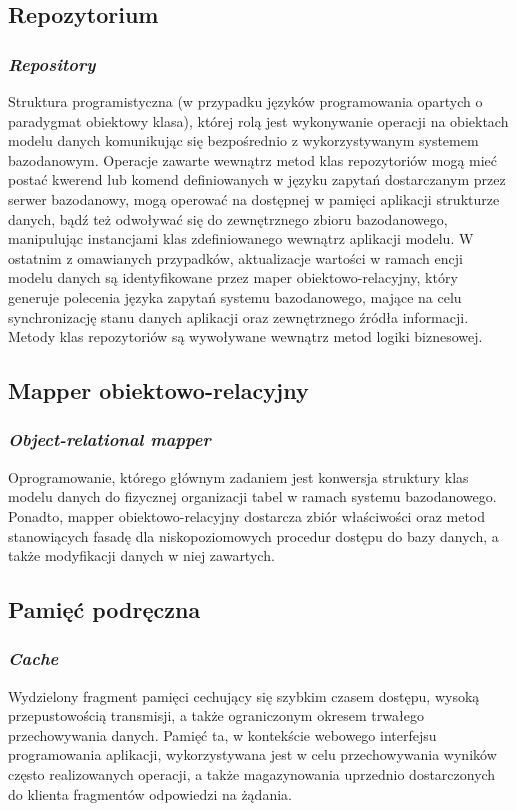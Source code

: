 \subsection*{Repozytorium}
\subsubsection{\textit{Repository}}
Struktura programistyczna (w przypadku języków programowania opartych o paradygmat obiektowy klasa), której rolą jest wykonywanie operacji na obiektach modelu danych komunikując się bezpośrednio z wykorzystywanym systemem bazodanowym. Operacje zawarte wewnątrz metod klas repozytoriów mogą mieć postać kwerend lub komend definiowanych w języku zapytań dostarczanym przez serwer bazodanowy, mogą operować na dostępnej w pamięci aplikacji strukturze danych, bądź też odwoływać się do zewnętrznego zbioru bazodanowego, manipulując instancjami klas zdefiniowanego wewnątrz aplikacji modelu. W ostatnim z omawianych przypadków, aktualizacje wartości w ramach encji modelu danych są identyfikowane przez maper obiektowo-relacyjny, który generuje polecenia języka zapytań systemu bazodanowego, mające na celu synchronizację stanu danych aplikacji oraz zewnętrznego źródła informacji. Metody klas repozytoriów są wywoływane wewnątrz metod logiki biznesowej.

\subsection*{Mapper obiektowo-relacyjny}
\subsubsection{\textit{Object-relational mapper}}
Oprogramowanie, którego głównym zadaniem jest konwersja struktury klas modelu danych do fizycznej organizacji tabel w ramach systemu bazodanowego. Ponadto, mapper obiektowo-relacyjny dostarcza zbiór właściwości oraz metod stanowiących fasadę dla niskopoziomowych procedur dostępu do bazy danych, a także modyfikacji danych w niej zawartych.

\subsection*{Pamięć podręczna}
\subsubsection{\textit{Cache}}
Wydzielony fragment pamięci cechujący się szybkim czasem dostępu, wysoką przepustowością transmisji, a także ograniczonym okresem trwałego przechowywania danych. Pamięć ta, w kontekście webowego interfejsu programowania aplikacji, wykorzystywana jest w celu przechowywania wyników często realizowanych operacji, a także magazynowania uprzednio dostarczonych do klienta fragmentów odpowiedzi na żądania.

